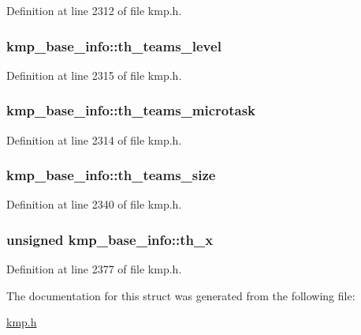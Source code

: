 Definition at line 2312 of file kmp.\-h.

\hypertarget{structkmp__base__info_a8046bdfbf9417bb32e06ba1149a0c062}{
\subsubsection[{th\-\_\-teams\-\_\-level}]{ kmp\-\_\-base\-\_\-info\-::th\-\_\-teams\-\_\-level}}\label{structkmp__base__info_a8046bdfbf9417bb32e06ba1149a0c062}


Definition at line 2315 of file kmp.\-h.

\hypertarget{structkmp__base__info_a4da1ce47bc5e283cb4b8b2e88a152c51}{
\subsubsection[{th\-\_\-teams\-\_\-microtask}]{ kmp\-\_\-base\-\_\-info\-::th\-\_\-teams\-\_\-microtask}}\label{structkmp__base__info_a4da1ce47bc5e283cb4b8b2e88a152c51}


Definition at line 2314 of file kmp.\-h.

\hypertarget{structkmp__base__info_ab174e1ae25a32168047ae559f7bcd68a}{
\subsubsection[{th\-\_\-teams\-\_\-size}]{ kmp\-\_\-base\-\_\-info\-::th\-\_\-teams\-\_\-size}}\label{structkmp__base__info_ab174e1ae25a32168047ae559f7bcd68a}


Definition at line 2340 of file kmp.\-h.

\hypertarget{structkmp__base__info_ade96af70a102039d5a6541c992178749}{
\subsubsection[{th\-\_\-x}]{\setlength{\rightskip}{0pt plus 5cm}unsigned kmp\-\_\-base\-\_\-info\-::th\-\_\-x}}\label{structkmp__base__info_ade96af70a102039d5a6541c992178749}


Definition at line 2377 of file kmp.\-h.



The documentation for this struct was generated from the following file\-:\begin{DoxyCompactItemize}
\item 
\hyperlink{kmp_8h}{kmp.\-h}\end{DoxyCompactItemize}
